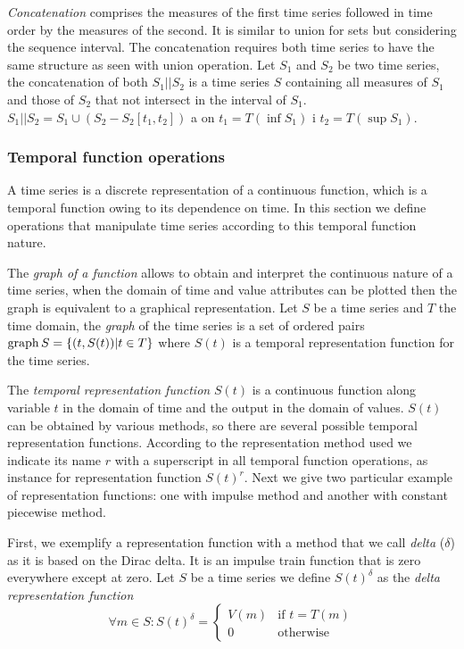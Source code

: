 \emph{Concatenation} comprises the measures of the first time series followed
in time order by the measures of the second. It is similar to union
for sets but considering the sequence interval. The concatenation
requires both time series to have the same structure as seen with
union operation.  Let $S_1$ and $S_2$ be two time series, the
concatenation of both $S_1 || S_2$ is a time series $S$ containing all
measures of $S_1$ and those of $S_2$ that not intersect in the
interval of $S_1$.  $S_1 || S_2 = S_1 \cup ( S_2 - S_2[t_1,t_2] )$ a
on $t_1=T(\inf S_1)$ i $t_2=T(\sup S_1)$.




\subsubsection{Temporal function operations}


A time series is a discrete representation of a continuous function,
which is a temporal function owing to its dependence on time. In this
section we define operations that manipulate time series according to
this temporal function nature.

The \emph{graph of a function} allows to obtain and interpret the
continuous nature of a time series, when the domain of time and value
attributes can be plotted then the graph is equivalent to a graphical
representation.  Let $S$ be a time series and $T$ the time domain, the
\emph{graph} of the time series is a set of ordered pairs $\operatorname*{graph} S =
\{ (t,S(t)) | t\in T \}$ where $S(t)$ is a temporal representation
function for the time series.

The \emph{temporal representation function} $S(t)$ is a continuous
function along variable $t$ in the domain of time and the output in
the domain of values. $S(t)$ can be obtained by various methods, so
there are several possible temporal representation
functions. According to the representation method used we indicate its
name $r$ with a superscript in all temporal function operations, as
instance for representation function $S(t)^r$. Next we give two
particular example of representation functions: one with impulse
method and another with constant piecewise method.



First, we exemplify a representation function with a method that we
call \emph{delta} ($\delta$) as it is based on the Dirac delta. It is
an impulse train function that is zero everywhere except at zero.  Let
$S$ be a time series we define $S(t)^\delta$ as the \emph{delta
  representation function}
\[
    \forall m \in S: S(t)^\delta
    =  \begin{cases}
      V(m) & \text{if }  t=T(m) \\
      0 & \text{otherwise}
    \end{cases}
\]



